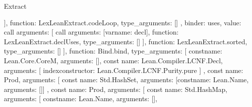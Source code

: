 \begin{lexlean}{Extract}
\begin{toolingmodule}
{{{{{{{{{{{{{{{{{{{                                                  }
                                                ],
                                                function: LexLeanExtract.codeLoop,
                                                type_arguments: []
                                              },
                                              binder: uses,
                                              value: call{
                                                arguments: [
                                                  call{
                                                    arguments: [var{name: decl}],
                                                    function: LexLeanExtract.declUses,
                                                    type_arguments: []
                                                  }
                                                ],
                                                function: LexLeanExtract.sorted,
                                                type_arguments: []
                                              }
                                            }
                                          }
                                        ],
                                        function: Bind.bind,
                                        type_arguments: [
                                          const{name: Lean.Core.CoreM, arguments: []},
                                          const{
                                            name: Lean.Compiler.LCNF.Decl,
                                            arguments: [
                                              index{constructor: Lean.Compiler.LCNF.Purity.pure}
                                            ]
                                          },
                                          const{
                                            name: Prod,
                                            arguments: [
                                              const{
                                                name: Std.HashSet,
                                                arguments: [const{name: Lean.Name, arguments: []}]
                                              },
                                              const{
                                                name: Prod,
                                                arguments: [
                                                  const{
                                                    name: Std.HashMap,
                                                    arguments: [
                                                      const{name: Lean.Name, arguments: []},
}}}}}}}}}}}}}}}}}}
\end{toolingmodule}
\end{lexlean}
